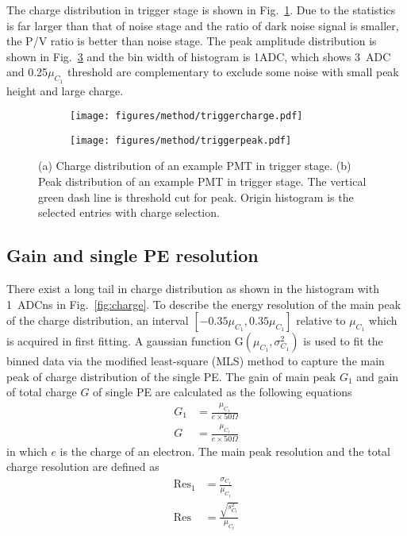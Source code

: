The charge distribution in trigger stage is shown in Fig.~\ref{fig:triggercharge}. Due to the statistics is far larger than that of noise stage and the ratio of dark noise signal is smaller, the P/V ratio is better than noise stage. The peak amplitude distribution is shown in Fig.~\ref{fig:triggerpeak} and the bin width of histogram is 1ADC, which shows \SI{3}{ADC} and 0.25$\mu_{C_1}$ threshold are complementary to exclude some noise with small peak height and large charge.

\begin{figure}[!htbp]
    \centering
    \begin{subfigure}[b]{0.4\textwidth}
        \texttt{[image: figures/method/triggercharge.pdf]}
        \caption{}%
        \label{fig:triggercharge}
    \end{subfigure}
    \begin{subfigure}[b]{0.4\textwidth}
        \texttt{[image: figures/method/triggerpeak.pdf]}
        \caption{}%
        \label{fig:triggerpeak}
    \end{subfigure}
    \caption{(a) Charge distribution of an example PMT in trigger stage. (b) Peak distribution of an example PMT in trigger stage. The vertical green dash line is threshold cut for peak. Origin histogram is the selected entries with charge selection.}
\end{figure}

\subsection{Gain and single PE resolution}
\label{sec:noisegain}
There exist a long tail in charge distribution as shown in the histogram with \SI{1}{ADCns} in Fig.~\ref{fig:charge}. To describe the energy resolution of the main peak of the charge distribution, an interval $[-0.35\mu_{C_1}, 0.35\mu_{C_1}]$ relative to $\mu_{C_1}$ which is acquired in first fitting. A gaussian function G$(\mu_{C_1},\sigma^2_{C_1})$ is used to fit the binned data via the modified least-square (MLS) method \cite{Cowan1998StatisticalDA} to capture the main peak of charge distribution of the single PE. The gain of main peak $G_1$ and gain of total charge $G$ of single PE are calculated as the following equations
\begin{align}
    G_1&=\frac{\mu_{C_1}}{e\times 50\Omega} \\
    G &= \frac{\mu_{C_t}}{e\times 50\Omega}
\end{align}
in which $e$ is the charge of an electron. The main peak resolution and the total charge resolution are defined as
\begin{align}
    \mathrm{Res}_1&=\frac{\sigma_{C_1}}{\mu_{C_1}}\\
    \mathrm{Res}&=\frac{\sqrt{s^2_{C_t}}}{\mu_{C_t}}
\end{align}

